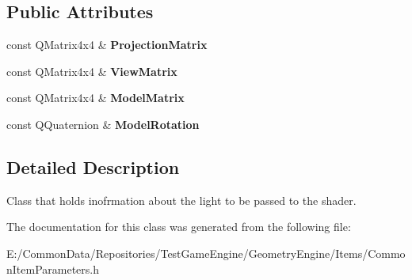 \subsection*{Public Attributes}
\begin{DoxyCompactItemize}
\item 
\mbox{\label{class_geometry_engine_1_1_lighting_transformation_data_a67f3cbd5104398dae3988fe228128422}} 
const Q\+Matrix4x4 \& {\bfseries Projection\+Matrix}
\item 
\mbox{\label{class_geometry_engine_1_1_lighting_transformation_data_ae7610e04dd2bc7c8fc05c69d6809dda6}} 
const Q\+Matrix4x4 \& {\bfseries View\+Matrix}
\item 
\mbox{\label{class_geometry_engine_1_1_lighting_transformation_data_a5420a915cce7b22552030b82b00d5142}} 
const Q\+Matrix4x4 \& {\bfseries Model\+Matrix}
\item 
\mbox{\label{class_geometry_engine_1_1_lighting_transformation_data_a3d67f5f8a46ac726ef33aced8455d068}} 
const Q\+Quaternion \& {\bfseries Model\+Rotation}
\end{DoxyCompactItemize}


\subsection{Detailed Description}
Class that holds inofrmation about the light to be passed to the shader. 

The documentation for this class was generated from the following file\+:\begin{DoxyCompactItemize}
\item 
E\+:/\+Common\+Data/\+Repositories/\+Test\+Game\+Engine/\+Geometry\+Engine/\+Items/Common\+Item\+Parameters.\+h\end{DoxyCompactItemize}
